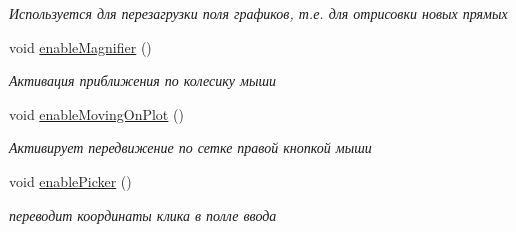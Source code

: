 \begin{DoxyCompactItemize}
\begin{DoxyCompactList}\small\item\em Используется для перезагрузки поля графиков, т.\+е. для отрисовки новых прямых \end{DoxyCompactList}\item 
void \hyperlink{class_main_window_afdb82afd72e8643eddf6f4c0266489e8}{enable\+Magnifier} ()\hypertarget{class_main_window_afdb82afd72e8643eddf6f4c0266489e8}{}\label{class_main_window_afdb82afd72e8643eddf6f4c0266489e8}

\begin{DoxyCompactList}\small\item\em Активация приближения по колесику мыши \end{DoxyCompactList}\item 
void \hyperlink{class_main_window_ad04c0aea2156c338a745b02ac456343b}{enable\+Moving\+On\+Plot} ()\hypertarget{class_main_window_ad04c0aea2156c338a745b02ac456343b}{}\label{class_main_window_ad04c0aea2156c338a745b02ac456343b}

\begin{DoxyCompactList}\small\item\em Активирует передвижение по сетке правой кнопкой мыши \end{DoxyCompactList}\item 
void \hyperlink{class_main_window_ac532634c85e6e35dfbd7c5d1c1520e62}{enable\+Picker} ()\hypertarget{class_main_window_ac532634c85e6e35dfbd7c5d1c1520e62}{}\label{class_main_window_ac532634c85e6e35dfbd7c5d1c1520e62}

\begin{DoxyCompactList}\small\item\em переводит координаты клика в полле ввода \end{DoxyCompactList}\end{DoxyCompactItemize}

